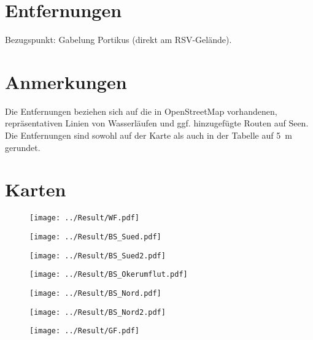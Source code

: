 \documentclass{article}
\begin{document}
    \section*{Entfernungen}
    Bezugspunkt: Gabelung Portikus (direkt am RSV-Gelände). \\        
    
    \section*{Anmerkungen}
    Die Entfernungen beziehen sich auf die in OpenStreetMap vorhandenen,
    repräsentativen Linien von Wasserläufen und ggf. hinzugefügte Routen auf
    Seen. Die Entfernungen sind sowohl auf der Karte als auch in der Tabelle auf 5~m gerundet.
    
    \newpage
    \section*{Karten}

    \begin{figure}[!h]
        \centering
        \texttt{[image: ../Result/WF.pdf]}
    \end{figure}
    \newpage
    
    \begin{figure}[!h]
        \centering
        \texttt{[image: ../Result/BS\_Sued.pdf]}
    \end{figure}
    \newpage
    
    \begin{figure}[!h]
        \centering
        \texttt{[image: ../Result/BS\_Sued2.pdf]}
    \end{figure}
    \newpage
    
    \begin{figure}[!h]
        \centering
        \texttt{[image: ../Result/BS\_Okerumflut.pdf]}
    \end{figure}
    \newpage
    
    \begin{figure}[!h]
        \centering
        \texttt{[image: ../Result/BS\_Nord.pdf]}
    \end{figure}
    \newpage
    
    \begin{figure}[!h]
        \centering
        \texttt{[image: ../Result/BS\_Nord2.pdf]}
    \end{figure}
    \newpage
    
    \begin{figure}[!h]
        \centering
        \texttt{[image: ../Result/GF.pdf]}
    \end{figure}
\end{document}
